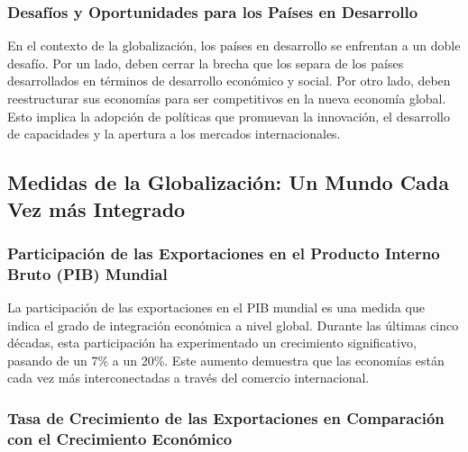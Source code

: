 \documentclass[
  letterpaper,
  DIV=11,
  numbers=noendperiod]{scrartcl}
\begin{document}
\hypertarget{desafuxedos-y-oportunidades-para-los-pauxedses-en-desarrollo}{%
\subsubsection{Desafíos y Oportunidades para los Países en
Desarrollo}\label{desafuxedos-y-oportunidades-para-los-pauxedses-en-desarrollo}}

En el contexto de la globalización, los países en desarrollo se
enfrentan a un doble desafío. Por un lado, deben cerrar la brecha que
los separa de los países desarrollados en términos de desarrollo
económico y social. Por otro lado, deben reestructurar sus economías
para ser competitivos en la nueva economía global. Esto implica la
adopción de políticas que promuevan la innovación, el desarrollo de
capacidades y la apertura a los mercados internacionales.

\hypertarget{medidas-de-la-globalizaciuxf3n-un-mundo-cada-vez-muxe1s-integrado}{%
\subsection{Medidas de la Globalización: Un Mundo Cada Vez más
Integrado}\label{medidas-de-la-globalizaciuxf3n-un-mundo-cada-vez-muxe1s-integrado}}

\hypertarget{participaciuxf3n-de-las-exportaciones-en-el-producto-interno-bruto-pib-mundial}{%
\subsubsection{Participación de las Exportaciones en el Producto Interno
Bruto (PIB)
Mundial}\label{participaciuxf3n-de-las-exportaciones-en-el-producto-interno-bruto-pib-mundial}}

La participación de las exportaciones en el PIB mundial es una medida
que indica el grado de integración económica a nivel global. Durante las
últimas cinco décadas, esta participación ha experimentado un
crecimiento significativo, pasando de un 7\% a un 20\%. Este aumento
demuestra que las economías están cada vez más interconectadas a través
del comercio internacional.

\hypertarget{tasa-de-crecimiento-de-las-exportaciones-en-comparaciuxf3n-con-el-crecimiento-econuxf3mico}{%
\subsubsection{Tasa de Crecimiento de las Exportaciones en Comparación
con el Crecimiento
Económico}\label{tasa-de-crecimiento-de-las-exportaciones-en-comparaciuxf3n-con-el-crecimiento-econuxf3mico}}
\end{document}
